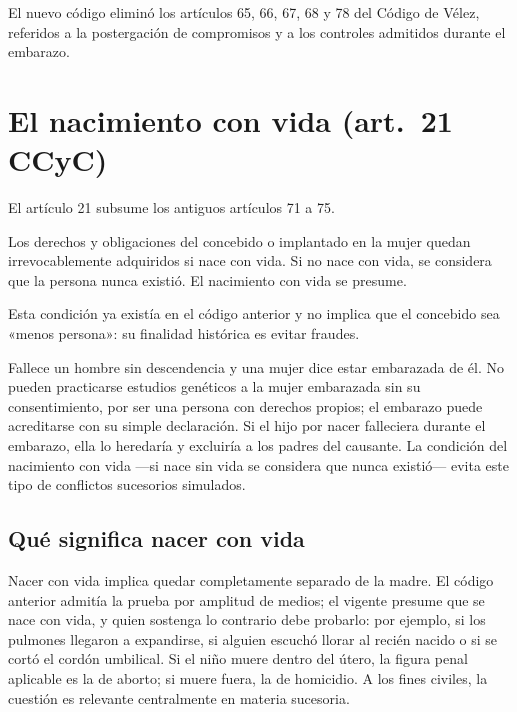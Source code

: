 \documentclass[12pt,oneside]{book}
\begin{document}
El nuevo código eliminó los artículos 65, 66, 67, 68 y 78 del Código de Vélez, referidos a la postergación de compromisos y a los controles admitidos durante el embarazo.

\section{El nacimiento con vida (art.~21 CCyC)}

El artículo 21 subsume los antiguos artículos 71 a 75.

\begin{regla}
Los derechos y obligaciones del concebido o implantado en la mujer quedan irrevocablemente adquiridos si nace con vida. Si no nace con vida, se considera que la persona nunca existió. El nacimiento con vida se presume.
\end{regla}

Esta condición ya existía en el código anterior y no implica que el concebido sea «menos persona»: su finalidad histórica es evitar fraudes.

\begin{ejemplo}
Fallece un hombre sin descendencia y una mujer dice estar embarazada de él. No pueden practicarse estudios genéticos a la mujer embarazada sin su consentimiento, por ser una persona con derechos propios; el embarazo puede acreditarse con su simple declaración. Si el hijo por nacer falleciera durante el embarazo, ella lo heredaría y excluiría a los padres del causante. La condición del nacimiento con vida ---si nace sin vida se considera que nunca existió--- evita este tipo de conflictos sucesorios simulados.
\end{ejemplo}

\subsection{Qué significa nacer con vida}

Nacer con vida implica quedar completamente separado de la madre. El código anterior admitía la prueba por amplitud de medios; el vigente presume que se nace con vida, y quien sostenga lo contrario debe probarlo: por ejemplo, si los pulmones llegaron a expandirse, si alguien escuchó llorar al recién nacido o si se cortó el cordón umbilical. Si el niño muere dentro del útero, la figura penal aplicable es la de aborto; si muere fuera, la de homicidio. A los fines civiles, la cuestión es relevante centralmente en materia sucesoria.
\end{document}
